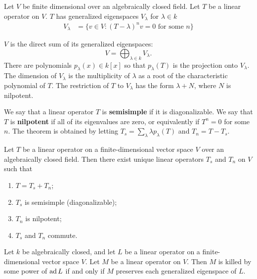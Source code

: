 \documentclass[12pt]{article}
\begin{document}
Let $V$ be finite dimensional over an algebraically closed field. Let $T$ be a linear operator on $V$. $T$ has generalized eigenspaces $V_\lambda$ for $\lambda \in k$ \begin{align*}
    V_\lambda & = \{v \in V : (T-\lambda)^n v = 0 \text{ for some } n\}
\end{align*}
\begin{theorem}
    $V$ is the direct sum of its generalized eigenspaces:
    \[V = \bigoplus_{\lambda \in k} V_\lambda.
    \] There are polynomials $p_\lambda(x) \in k[x]$ so that $p_\lambda(T)$ is the projection onto $V_\lambda$. The dimension of $V_\lambda$ is the multiplicity of $\lambda$ as a root of the characteristic polynomial of $T$. The restriction of $T$ to $V_\lambda$ has the form $\lambda + N$, where $N$ is nilpotent.
\end{theorem}
We say that a linear operator $T$ is \textbf{semisimple} if it is diagonalizable. We say that $T$ is \textbf{nilpotent} if all of its eigenvalues are zero, or equivalently if $T^n=0$ for some $n$. The theorem is obtained by letting $T_s = \sum_\lambda \lambda p_\lambda(T)$ and $T_n = T - T_s$.
\begin{theorem}
     Let $T$ be a linear operator on a finite-dimensional vector space $V$ over an algebraically closed field. Then there exist unique linear operators $T_s$ and $T_n$ on $V$ such that
    \begin{enumerate}
        \item $T=T_s+T_n$;
        \item $T_s$ is semisimple (diagonalizable);
        \item $T_n$ is nilpotent;
        \item $T_s$ and $T_n$ commute.
    \end{enumerate}
\end{theorem}

\begin{theorem}
    Let $k$ be algebraically closed, and let $L$ be a linear operator on a finite-dimensional vector space $V$. Let $M$ be a linear operator on $V$. Then $M$ is killed by some power of $\operatorname{ad} L$ if and only if $M$ preserves each generalized eigenspace of $L$.
\end{theorem}
\end{document}
